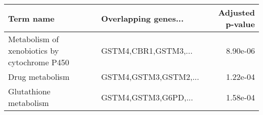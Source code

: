 \begin{tabular}{llr}
\toprule
                                   Term name &  Overlapping genes... &  Adjusted p-value \\
\midrule
Metabolism of xenobiotics by cytochrome P450 &  GSTM4,CBR1,GSTM3,... &          8.90e-06 \\
                             Drug metabolism & GSTM4,GSTM3,GSTM2,... &          1.22e-04 \\
                      Glutathione metabolism &  GSTM4,GSTM3,G6PD,... &          1.58e-04 \\
\bottomrule
\end{tabular}

